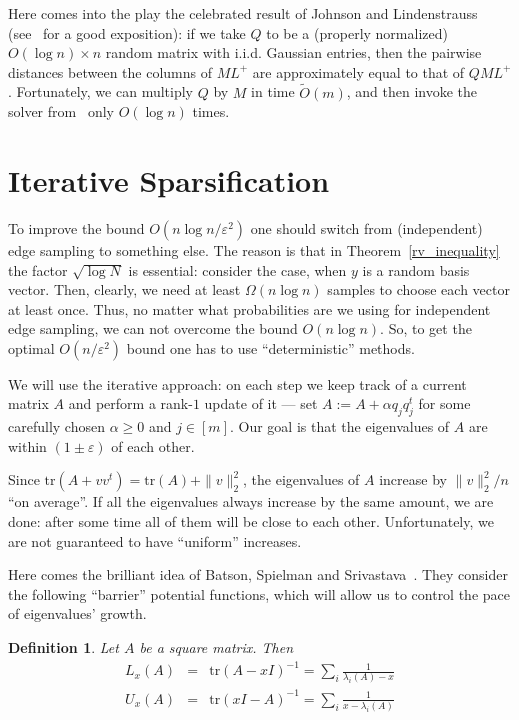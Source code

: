 \documentclass[12pt]{article}
\newcommand{\eps}{\varepsilon}
\newtheorem{definition}{Definition}
\begin{document}
    Here comes into the play the celebrated result of Johnson and Lindenstrauss
    (see~\cite{DG03} for a good exposition): if we take $Q$ to be a (properly normalized)
    $O(\log n) \times n$ random matrix with i.i.d. Gaussian entries, then
    the pairwise distances between the columns of $ML^+$ are approximately equal to that of
    $QML^+$. Fortunately, we can multiply $Q$ by $M$ in time $\tilde{O}(m)$, and then
    invoke the solver from~\cite{KMP10} only $O(\log n)$ times.

    \section{Iterative Sparsification}
    \label{iterative}

    To improve the bound $O(n \log n / \eps^2)$ one should switch from (independent) edge sampling to something else.
    The reason is that in Theorem~\ref{rv_inequality} the factor $\sqrt{\log N}$ is essential: consider the case,
    when $y$ is a random basis vector. Then, clearly, we need at least $\Omega(n \log n)$ samples to choose each
    vector at least once. Thus, no matter what probabilities are we using for independent edge sampling, we can not
    overcome the bound $O(n \log n)$.
    So, to get the optimal $O(n / \eps^2)$ bound one has to use ``deterministic'' methods.

    We will use the iterative approach: on each step we keep track of a current matrix $A$
    and perform a rank-$1$ update of it --- set $A := A + \alpha q_j q_j^t$ for some carefully chosen $\alpha \geq 0$ and
    $j \in [m]$. Our goal is that the eigenvalues of $A$ are within $(1 \pm \eps)$ of each other.

    Since $\mathrm{tr}(A + vv^t) = \mathrm{tr}(A) + \|v\|_2^2$, the eigenvalues of $A$ increase by
    $\|v\|_2^2 / n$ ``on average''. If all the eigenvalues always increase by the same amount, we are done: after some time
    all of them will be close to each other.
    Unfortunately, we are not guaranteed to have ``uniform'' increases.

    Here comes the brilliant idea of Batson, Spielman and Srivastava~\cite{BSS09}.
    They consider the following ``barrier'' potential functions, which will allow us to control the pace of eigenvalues'
    growth.

    \begin{definition}
        Let $A$ be a square matrix. Then
        \begin{eqnarray*}
            L_x(A) &=& \mathrm{tr}(A - xI)^{-1} = \sum_i \frac{1}{\lambda_i(A) - x}\\
            U_x(A) &=& \mathrm{tr}(xI - A)^{-1} = \sum_i \frac{1}{x - \lambda_i(A)}\\
        \end{eqnarray*}
    \end{definition}
\end{document}
